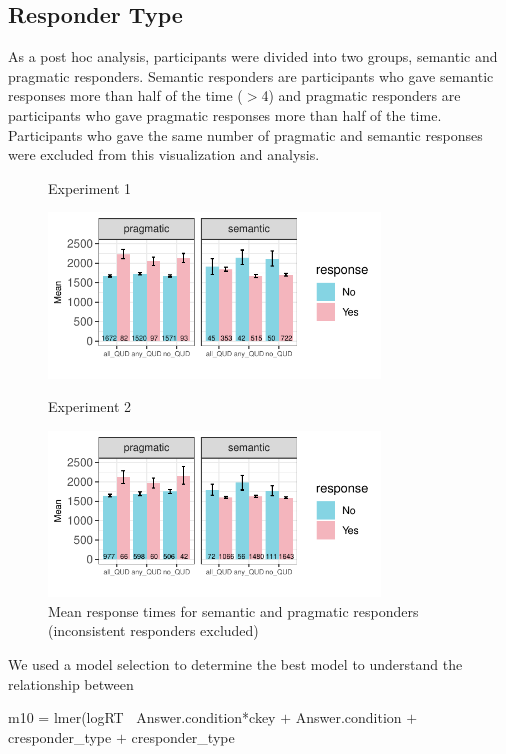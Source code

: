 \documentclass[12pt]{article}
\begin{document}
\subsection*{Responder Type}
As a post hoc analysis, participants were divided into two groups, semantic and pragmatic responders. Semantic responders are participants who gave semantic responses more than half of the time ($>$4) and pragmatic responders are participants who gave pragmatic responses more than half of the time. Participants who gave the same number of pragmatic and semantic responses were excluded from this visualization and analysis. 

\begin{figure}[!ht] 
    \begin{minipage}{.5\textwidth}
        \caption*{Experiment 1}
        \includegraphics[height=4.4cm]{img/exp4_responder.pdf}
    \end{minipage}%
    \begin{minipage}{.5\textwidth}
        \caption*{Experiment 2}
        \includegraphics[height=4.4cm]{img/exp5_responder.pdf}
    \end{minipage}%
    \caption{Mean response times for semantic and pragmatic responders (inconsistent responders excluded)}
\end{figure}

We used a model selection to determine the best model to understand the relationship between

m10 = lmer(logRT $~$ Answer.condition*ckey $+$ Answer.condition $+$ cresponder\_type $+$ cresponder_type 
 


\pagebreak


\end{document}
